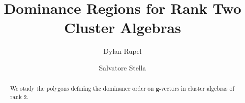 \documentclass{amsart}
\title{Dominance Regions for Rank Two Cluster Algebras}
\author{Dylan Rupel}
\author{Salvatore Stella}
\numberwithin{theorem}{section}
\newcommand{\bfg}{\boldsymbol{g}}
\begin{document}
  \begin{abstract}
    We study the polygons defining the dominance order on $\bfg$-vectors in cluster algebras of rank 2.
  \end{abstract}
  \maketitle
\end{document}
